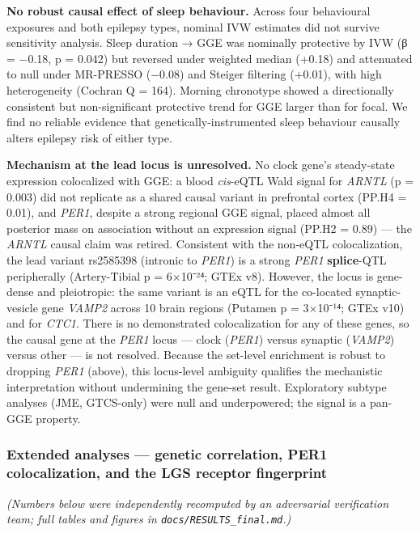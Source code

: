 \documentclass[
]{article}
\begin{document}
\textbf{No robust causal effect of sleep behaviour.} Across four
behavioural exposures and both epilepsy types, nominal IVW estimates did
not survive sensitivity analysis. Sleep duration → GGE was nominally
protective by IVW (β = −0.18, p = 0.042) but reversed under weighted
median (+0.18) and attenuated to null under MR-PRESSO (−0.08) and
Steiger filtering (+0.01), with high heterogeneity (Cochran Q = 164).
Morning chronotype showed a directionally consistent but non-significant
protective trend for GGE larger than for focal. We find no reliable
evidence that genetically-instrumented sleep behaviour causally alters
epilepsy risk of either type.

\textbf{Mechanism at the lead locus is unresolved.} No clock gene's
steady-state expression colocalized with GGE: a blood \emph{cis}-eQTL
Wald signal for \emph{ARNTL} (p = 0.003) did not replicate as a shared
causal variant in prefrontal cortex (PP.H4 = 0.01), and \emph{PER1},
despite a strong regional GGE signal, placed almost all posterior mass
on association without an expression signal (PP.H2 = 0.89) --- the
\emph{ARNTL} causal claim was retired. Consistent with the non-eQTL
colocalization, the lead variant rs2585398 (intronic to \emph{PER1}) is
a strong \emph{PER1} \textbf{splice}-QTL peripherally (Artery-Tibial p =
6×10⁻²⁴; GTEx v8). However, the locus is gene-dense and pleiotropic: the
same variant is an eQTL for the co-located synaptic-vesicle gene
\emph{VAMP2} across 10 brain regions (Putamen p = 3×10⁻¹⁴; GTEx v10) and
for \emph{CTC1}. There is no demonstrated colocalization for any of
these genes, so the causal gene at the \emph{PER1} locus --- clock
(\emph{PER1}) versus synaptic (\emph{VAMP2}) versus other --- is not
resolved. Because the set-level enrichment is robust to dropping
\emph{PER1} (above), this locus-level ambiguity qualifies the
mechanistic interpretation without undermining the gene-set result.
Exploratory subtype analyses (JME, GTCS-only) were null and
underpowered; the signal is a pan-GGE property.

\subsubsection{Extended analyses --- genetic correlation, PER1
colocalization, and the LGS receptor
fingerprint}\label{extended-analyses-genetic-correlation-per1-colocalization-and-the-lgs-receptor-fingerprint}

\emph{(Numbers below were independently recomputed by an adversarial
verification team; full tables and figures in
\texttt{docs/RESULTS\_final.md}.)}
\end{document}
